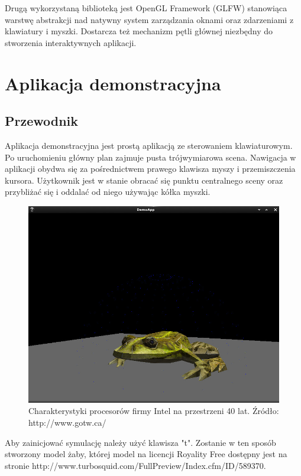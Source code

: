 Drugą wykorzystaną biblioteką jest OpenGL Framework (GLFW) stanowiąca warstwę
abstrakcji nad natywny system zarządzania oknami oraz zdarzeniami z klawiatury i
myszki. Dostarcza też mechanizm pętli głównej niezbędny do stworzenia
interaktywnych aplikacji.

\section{Aplikacja demonstracyjna}
\subsection{Przewodnik}
Aplikacja demonstracyjna jest prostą aplikacją ze sterowaniem klawiaturowym. Po
uruchomieniu główny plan zajmuje pusta trójwymiarowa scena. Nawigacja w
aplikacji obydwa się za pośrednictwem prawego klawisza myszy i przemiszczenia
kursora. Użytkownik jest w stanie obracać się punktu
centralnego sceny oraz przybliżać się i oddalać od niego używając kółka myszki.

\begin{figure}[H]
\centering
\includegraphics[scale=0.5]{images/z1.jpg}
\caption{Charakterystyki procesorów firmy Intel na przestrzeni 40 lat. Źródło: http://www.gotw.ca/}
\end{figure}

Aby zainicjować symulację należy użyć klawisza "t". Zostanie w ten sposób
stworzony model żaby, której model na licencji Royality Free
dostępny jest na stronie http://www.turbosquid.com/FullPreview/Index.cfm/ID/589370.

